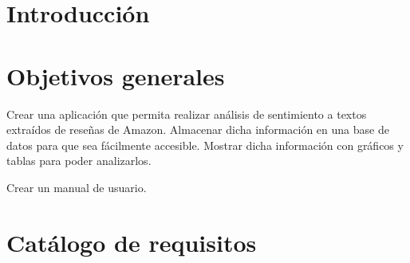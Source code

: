 ﻿
\section{Introducción}
\section{Objetivos generales}

Crear una aplicación que permita realizar análisis de sentimiento a textos extraídos de reseñas de Amazon.
Almacenar dicha información en una base de datos para que sea fácilmente accesible.
Mostrar dicha información con gráficos y tablas para poder analizarlos.

Crear un manual de usuario. 

\section{Catálogo de requisitos}
